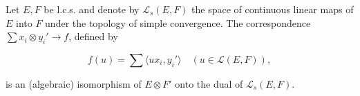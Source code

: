 Let $E, F$ be l.c.s. and denote by $\mathcal{L}_s(E, F)$ the space of continuous linear maps of $E$ into $F$ under the topology of simple convergence. The correspondence $\sum x_i \otimes y_i' \to f$, defined by

$$f(u) = \sum \langle u x_i, y_i' \rangle \quad (u \in \mathcal{L}(E, F)),$$

is an (algebraic) isomorphism of $E \otimes F'$ onto the dual of $\mathcal{L}_s(E, F)$.
